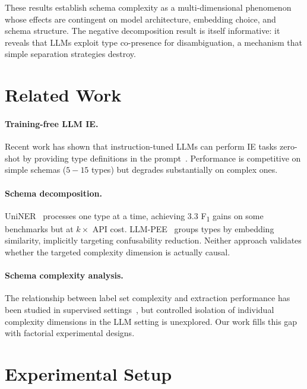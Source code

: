 \documentclass[11pt,a4paper]{article}
\begin{document}
These results establish schema complexity as a multi-dimensional phenomenon whose effects are contingent on model architecture, embedding choice, and schema structure.
The negative decomposition result is itself informative: it reveals that LLMs exploit type co-presence for disambiguation, a mechanism that simple separation strategies destroy.


\section{Related Work}
\label{sec:related}

\paragraph{Training-free LLM IE.}
Recent work has shown that instruction-tuned LLMs can perform IE tasks zero-shot by providing type definitions in the prompt~\cite{universal_ner_2024,gollie_2024,llmpee_2024}.
Performance is competitive on simple schemas ($5{-}15$ types) but degrades substantially on complex ones.

\paragraph{Schema decomposition.}
UniNER~\cite{universal_ner_2024} processes one type at a time, achieving 3.3 F\textsubscript{1} gains on some benchmarks but at $k{\times}$ API cost.
LLM-PEE~\cite{llmpee_2024} groups types by embedding similarity, implicitly targeting confusability reduction.
Neither approach validates whether the targeted complexity dimension is actually causal.

\paragraph{Schema complexity analysis.}
The relationship between label set complexity and extraction performance has been studied in supervised settings~\cite{few_nerd_2021,maven_2020}, but controlled isolation of individual complexity dimensions in the LLM setting is unexplored.
Our work fills this gap with factorial experimental designs.


\section{Experimental Setup}
\label{sec:setup}
\end{document}
